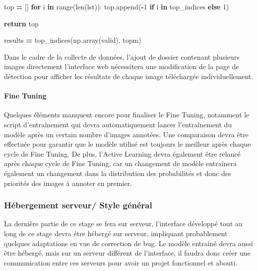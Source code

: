 \documentclass[
  10pt,
]{article}
\newenvironment{Shaded}{\begin{snugshade}}{\end{snugshade}}
\newcommand{\BuiltInTok}[1]{#1}
\newcommand{\ControlFlowTok}[1]{\textcolor[rgb]{0.13,0.29,0.53}{\textbf{#1}}}
\newcommand{\DecValTok}[1]{\textcolor[rgb]{0.00,0.00,0.81}{#1}}
\newcommand{\KeywordTok}[1]{\textcolor[rgb]{0.13,0.29,0.53}{\textbf{#1}}}
\newcommand{\NormalTok}[1]{#1}
\newcommand{\OperatorTok}[1]{\textcolor[rgb]{0.81,0.36,0.00}{\textbf{#1}}}
\begin{document}
\begin{Shaded}
\begin{Highlighting}[]
\NormalTok{    top }\OperatorTok{=}\NormalTok{ []}
    \ControlFlowTok{for}\NormalTok{ i }\KeywordTok{in} \BuiltInTok{range}\NormalTok{(}\BuiltInTok{len}\NormalTok{(lst)):}
\NormalTok{        top.append(}\OperatorTok{{-}}\DecValTok{1} \ControlFlowTok{if}\NormalTok{ i }\KeywordTok{in}\NormalTok{ top\_indices }\ControlFlowTok{else} \DecValTok{1}\NormalTok{)}

    \ControlFlowTok{return}\NormalTok{ top}

\NormalTok{results }\OperatorTok{=}\NormalTok{ top\_indices(np.array(valid), topm)}
\end{Highlighting}
\end{Shaded}

Dans le cadre de la collecte de données, l'ajout de dossier contenant
plusieurs images directement l'interface web nécessitera une
modification de la page de détection pour afficher les résultats de
chaque image téléchargée individuellement.

\paragraph{Fine Tuning}\label{fine-tuning-1}

Quelques éléments manquent encore pour finaliser le Fine Tuning,
notamment le script d'entraînement qui devra automatiquement lancer
l'entraînement du modèle après un certain nombre d'images annotées. Une
comparaison devra être effectuée pour garantir que le modèle utilisé est
toujours le meilleur après chaque cycle de Fine Tuning. De plus,
l'Active Learning devra également être relancé après chaque cycle de
Fine Tuning, car un changement de modèle entraînera également un
changement dans la distribution des probabilités et donc des priorités
des images à annoter en premier.

\subsubsection{Hébergement serveur/ Style
général}\label{huxe9bergement-serveur-style-guxe9nuxe9ral}

La dernière partie de ce stage se fera sur serveur, l'interface
développé tout au long de ce stage devra être hébergé sur serveur,
impliquant probablement quelques adaptations en vue de correction de
bug. Le modèle entrainé devra aussi être hébergé, mais sur un serveur
différent de l'interface, il faudra donc créer une communication entre
ces serveurs pour avoir un projet fonctionnel et abouti.
\end{document}
